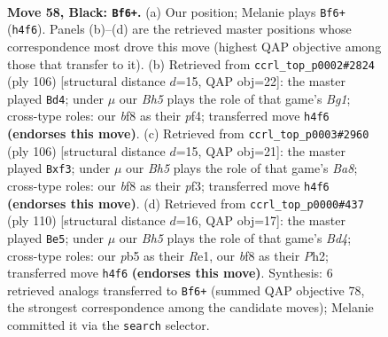 \documentclass[11pt]{article}
\begin{document}
\clearpage

\begin{figure}[p]\centering
\begin{subfigure}{0.46\textwidth}\centering
\resizebox{\linewidth}{!}{%
\newchessgame
\chessboard[
  setfen={5B2/P7/8/1P5k/3K1R1b/8/8/8 b - - 0 58},
  showmover=false,
  pgfstyle=straightmove, color=movearrow, markmove={h4-f6}
]}
\caption{}
\end{subfigure}\hfill
\begin{subfigure}{0.46\textwidth}\centering
\resizebox{\linewidth}{!}{%
\newchessgame
\chessboard[
  setfen={8/8/P5k1/8/5p2/6r1/4K3/6B1 w - - 2 54},
  showmover=false,
  pgfstyle=straightmove, color=movearrow, markmove={g1-d4}
]}
\caption{}
\end{subfigure}
\\[4pt]
\begin{subfigure}{0.46\textwidth}\centering
\resizebox{\linewidth}{!}{%
\newchessgame
\chessboard[
  setfen={B7/8/r4k2/8/8/5pP1/8/6K1 w - - 2 54},
  showmover=false,
  pgfstyle=straightmove, color=movearrow, markmove={a8-f3}
]}
\caption{}
\end{subfigure}\hfill
\begin{subfigure}{0.46\textwidth}\centering
\resizebox{\linewidth}{!}{%
\newchessgame
\chessboard[
  setfen={8/3r1k2/8/7b/2KB4/8/7P/4R3 w - - 19 56},
  showmover=false,
  pgfstyle=straightmove, color=movearrow, markmove={d4-e5}
]}
\caption{}
\end{subfigure}
\caption{\textbf{Move 58, Black: \texttt{Bf6+}.} (a) Our position; Melanie plays \texttt{Bf6+} (\texttt{h4f6}). Panels (b)--(d) are the retrieved master positions whose correspondence most drove this move (highest QAP objective among those that transfer to it). (b) Retrieved from \texttt{ccrl\_top\_p0002\#2824} (ply 106) [structural distance $d$=15, QAP obj=22]: the master played \texttt{Bd4}; under $\mu$ our \emph{Bh5} plays the role of that game's \emph{Bg1}; cross-type roles: our \emph{b}f8 as their \emph{p}f4; transferred move \texttt{h4f6} \textbf{(endorses this move)}. (c) Retrieved from \texttt{ccrl\_top\_p0003\#2960} (ply 106) [structural distance $d$=15, QAP obj=21]: the master played \texttt{Bxf3}; under $\mu$ our \emph{Bh5} plays the role of that game's \emph{Ba8}; cross-type roles: our \emph{b}f8 as their \emph{p}f3; transferred move \texttt{h4f6} \textbf{(endorses this move)}. (d) Retrieved from \texttt{ccrl\_top\_p0000\#437} (ply 110) [structural distance $d$=16, QAP obj=17]: the master played \texttt{Be5}; under $\mu$ our \emph{Bh5} plays the role of that game's \emph{Bd4}; cross-type roles: our \emph{p}b5 as their \emph{R}e1, our \emph{b}f8 as their \emph{P}h2; transferred move \texttt{h4f6} \textbf{(endorses this move)}. Synthesis: 6 retrieved analogs transferred to \texttt{Bf6+} (summed QAP objective 78, the strongest correspondence among the candidate moves); Melanie committed it via the \texttt{search} selector.}
\label{fig:thought-m115}
\end{figure}
\end{document}
